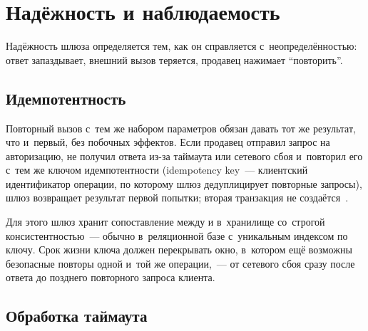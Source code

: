\section{Надёжность и наблюдаемость}\label{sec:gw-reliability}

Надёжность шлюза определяется тем, как он справляется
с~неопределённостью: ответ запаздывает, внешний вызов
теряется, продавец нажимает \enquote{повторить}.

\subsection*{Идемпотентность}

Повторный вызов с~тем же набором параметров обязан давать тот же
результат, что и~первый, без побочных эффектов.
Если продавец отправил запрос на авторизацию, не получил ответа
из-за таймаута или сетевого сбоя и~повторил его с~тем же ключом
идемпотентности (idempotency key~--- клиентский идентификатор
операции, по которому шлюз дедуплицирует повторные запросы),
шлюз возвращает результат первой попытки; вторая транзакция
не создаётся~\cite{stripe-idempotency}.

Для этого шлюз хранит сопоставление между
 и 
в~хранилище со~строгой консистентностью~--- обычно
в~реляционной базе с~уникальным индексом по ключу.
Срок жизни ключа должен перекрывать окно, в~котором
ещё возможны безопасные повторы одной и~той же операции,~---
от сетевого сбоя сразу после ответа до позднего повторного
запроса клиента.

\subsection*{Обработка таймаута}

